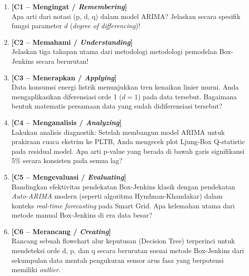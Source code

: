 \documentclass[11pt,a4paper]{article}
\begin{document}
\begin{enumerate}[leftmargin=1.8em, label=\textbf{Soal \arabic*.}]
    
    \item \textbf{[C1 -- Mengingat / \textit{Remembering}]} \\
    Apa arti dari notasi (p, d, q) dalam model ARIMA? Jelaskan secara spesifik fungsi parameter $d$ (\textit{degree of differencing})!
    \vspace{2.2cm}

    \item \textbf{[C2 -- Memahami / \textit{Understanding}]} \\
    Jelaskan tiga tahapan utama dari metodologi metodologi pemodelan Box-Jenkins secara berurutan!
    \vspace{2.8cm}

    \item \textbf{[C3 -- Menerapkan / \textit{Applying}]} \\
    Data konsumsi energi listrik menunjukkan tren kenaikan linier murni. Anda mengaplikasikan diferensiasi orde 1 ($d=1$) pada data tersebut. Bagaimana bentuk matematis persamaan data yang sudah didiferensiasi tersebut?
    \vspace{2.8cm}

    \newpage

    \item \textbf{[C4 -- Menganalisis / \textit{Analyzing}]} \\
    Lakukan analisis diagnostik: Setelah membangun model ARIMA untuk prakiraan cuaca ekstrim ke PLTB, Anda mengecek plot Ljung-Box Q-statistic pada residual model. Apa arti p-value yang berada di bawah garis signifikansi 5\% secara konsisten pada semua lag?
    \vspace{3.5cm}

    \item \textbf{[C5 -- Mengevaluasi / \textit{Evaluating}]} \\
    Bandingkan efektivitas pendekatan Box-Jenkins klasik dengan pendekatan \textit{Auto-ARIMA} modern (seperti algoritma Hyndman-Khandakar) dalam konteks \textit{real-time forecasting} pada Smart Grid. Apa kelemahan utama dari metode manual Box-Jenkins di era data besar?
    \vspace{3.5cm}

    \item \textbf{[C6 -- Merancang / \textit{Creating}]} \\
    Rancang sebuah flowchart alur keputusan (Decision Tree) terperinci untuk mendeteksi orde d, p, dan q secara berurutan sesuai metode Box-Jenkins dari sekumpulan data mentah pengukuran sensor arus fasa yang berpotensi memiliki \textit{outlier}.
    \vspace{4.5cm}

\end{enumerate}
\end{document}
